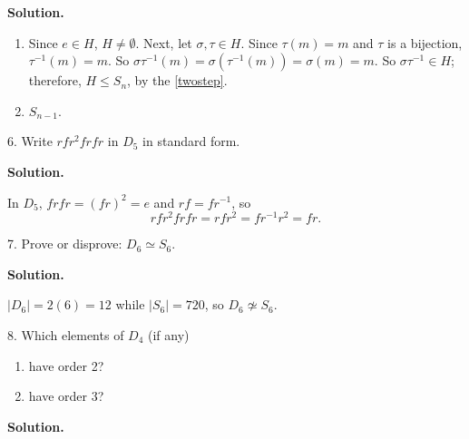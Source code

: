\documentclass[10pt,]{book}
\theoremstyle{plain}
\theoremstyle{definition}
\theoremstyle{definition}
\theoremstyle{definition}
\theoremstyle{definition}
\numberwithin{equation}{section}
\begin{document}
\begin{exerciselist}
\par\smallskip
\par\smallskip
\noindent\textbf{Solution.}\hypertarget{solution-45}{}\quad
\leavevmode%
\begin{enumerate}[label=(\alph*)]
\item\hypertarget{li-378}{}
          Since \(e\in H\), \(H\neq \emptyset\).  Next, let \(\sigma, \tau\in H\).  Since \(\tau(m)=m\) and \(\tau\) is a bijection, \(\tau^{-1}(m)=m\).  So \(\sigma \tau^{-1}(m)=\sigma(\tau^{-1}(m))=\sigma(m)=m\).  So \(\sigma \tau^{-1}\in H\); therefore, \(H\leq S_n\), by the \hyperref[twostep]{\ref{twostep}}.
\item\hypertarget{li-379}{}
          \(S_{n-1}\).
\end{enumerate}
\item[6.]\hypertarget{exercise-46}{}
        Write \(rfr^2frfr\) in \(D_5\) in standard form.
\par\smallskip
\par\smallskip
\noindent\textbf{Solution.}\hypertarget{solution-46}{}\quad

      In \(D_5\), \(frfr=(fr)^2=e\) and \(rf=fr^{-1}\), so
\begin{equation*}

        rfr^2frfr=rfr^2=fr^{-1}r^2=fr.
      
\end{equation*}

\item[7.]\hypertarget{exercise-47}{}
        Prove or disprove: \(D_6\simeq S_6\).
\par\smallskip
\par\smallskip
\noindent\textbf{Solution.}\hypertarget{solution-47}{}\quad

      \(|D_6|=2(6)=12\) while \(|S_6|=720\), so \(D_6\not\simeq S_6\).
\item[8.]\hypertarget{exercise-48}{} Which elements of \(D_4\) (if any)
        \leavevmode%
\begin{enumerate}[label=(\alph*)]
\item\hypertarget{li-380}{}
              have order 2?
\item\hypertarget{li-381}{}
              have order \(3\)?
\end{enumerate}

\par\smallskip
\par\smallskip
\noindent\textbf{Solution.}\hypertarget{solution-48}{}\quad


\end{exerciselist}
\end{document}
